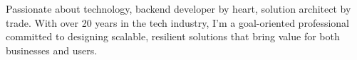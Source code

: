 

\begin{cvparagraph}
Passionate about technology, backend developer by heart, solution architect by trade. With over 20 years in the tech industry, I'm a goal-oriented professional committed to designing scalable, resilient solutions that bring value for both businesses and users.
\end{cvparagraph}
